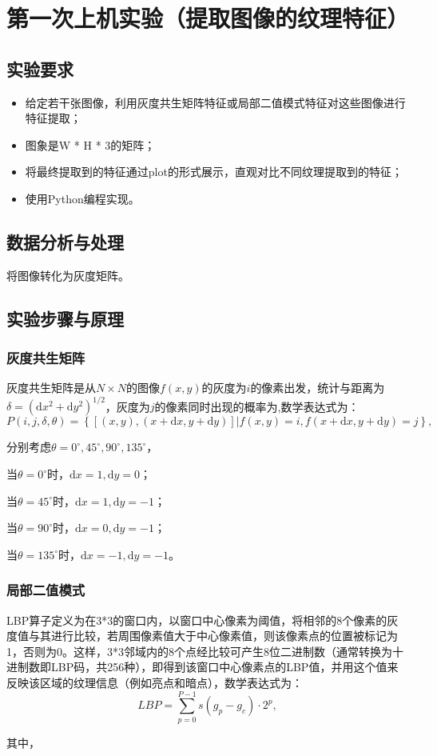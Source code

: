 \documentclass[a4paper,12pt]{report}
\begin{document}
\chapter{第一次上机实验（提取图像的纹理特征）}
\section{实验要求}
\begin{itemize}
    \item 给定若干张图像，利用灰度共生矩阵特征或局部二值模式特征对这些图像进行特征提取；
    \item 图象是W * H * 3的矩阵；
    \item 将最终提取到的特征通过plot的形式展示，直观对比不同纹理提取到的特征；
    \item 使用Python编程实现。
\end{itemize}
\section{数据分析与处理}
\par 将图像转化为灰度矩阵。
\section{实验步骤与原理}
\subsection{灰度共生矩阵}
\par 灰度共生矩阵是从$N\times N$的图像$f(x,y)$的灰度为$i$的像素出发，统计与距离为$\delta=(\mathrm{d}x^{2}+\mathrm{d}y^{2})^{1/2}$，灰度为$j$的像素同时出现的概率为,数学表达式为：$$P(i,j,\delta,\theta)=\left\{[(x,y),(x+\mathrm{d}x,y+\mathrm{d}y)]|f(x,y)=i,f(x+\mathrm{d}x,y+\mathrm{d}y)=j\right\},$$
\par 分别考虑$\theta=0^{\circ},45^{\circ},90^{\circ},135^{\circ}$，
\par 当$\theta=0^{\circ}$时，$\mathrm{d}x=1,\mathrm{d}y=0$；
\par 当$\theta=45^{\circ}$时，$\mathrm{d}x=1,\mathrm{d}y=-1$；
\par 当$\theta=90^{\circ}$时，$\mathrm{d}x=0,\mathrm{d}y=-1$；
\par 当$\theta=135^{\circ}$时，$\mathrm{d}x=-1,\mathrm{d}y=-1$。
\subsection{局部二值模式}
\par LBP算子定义为在3*3的窗口内，以窗口中心像素为阈值，将相邻的8个像素的灰度值与其进行比较，若周围像素值大于中心像素值，则该像素点的位置被标记为1，否则为0。这样，3*3邻域内的8个点经比较可产生8位二进制数（通常转换为十进制数即LBP码，共256种），即得到该窗口中心像素点的LBP值，并用这个值来反映该区域的纹理信息（例如亮点和暗点），数学表达式为：
$$LBP=\sum_{p=0}^{P−1} s(g_p−g_c)\cdot 2^p,$$
\par 其中，
\end{document}
